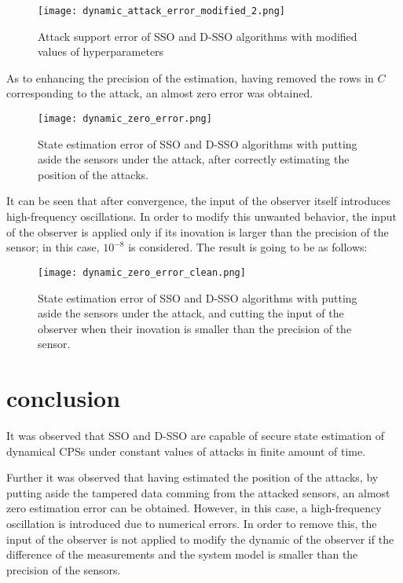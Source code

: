 \begin{figure}[H] %
    \centering
    \texttt{[image: dynamic\_attack\_error\_modified\_2.png]} %
    \caption{Attack support error of SSO and D-SSO algorithms with modified values of hyperparameters}
\end{figure}

As to enhancing the precision of the estimation, having removed the rows in $C$ corresponding to the attack, an almost zero error was obtained.

\begin{figure}[H] %
    \centering
    \texttt{[image: dynamic\_zero\_error.png]} %
    \caption{State estimation error of SSO and D-SSO algorithms with putting aside the sensors under the attack, after correctly estimating the position of the attacks.}
\end{figure}

It can be seen that after convergence, the input of the observer itself introduces high-frequency oscillations. In order to modify this unwanted behavior, the input of the observer is applied only if its inovation is larger than the precision of the sensor; in this case, $10^{-8}$ is considered. The result is going to be as follows:


\begin{figure}[H] %
    \centering
    \texttt{[image: dynamic\_zero\_error\_clean.png]} %
    \caption{State estimation error of SSO and D-SSO algorithms with putting aside the sensors under the attack, and cutting the input of the observer when their inovation is smaller than the precision of the sensor.}
\end{figure}
 
\section{conclusion}
It was observed that SSO and D-SSO are capable of secure state estimation of dynamical CPSs under constant values of attacks in finite amount of time. 

Further it was observed that having estimated the position of the attacks, by putting aside the tampered data comming from the attacked sensors, an almost zero estimation error can be obtained. However, in this case, a high-frequency oscillation is introduced due to numerical errors. In order to remove this, the input of the observer is not applied to modify the dynamic of the observer if the difference of the measurements and the system model is smaller than the precision of the sensors.











